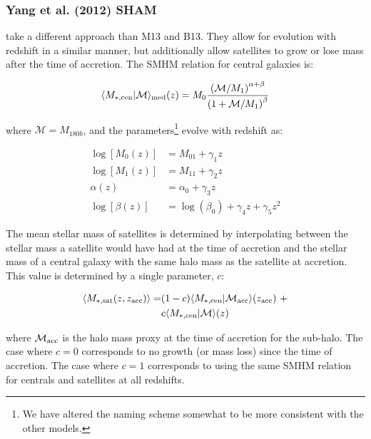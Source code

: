 \documentclass[a4paper,fleqn,usenatbib]{mnras}
\begin{document}
\subsubsection{Yang et al. (2012) SHAM}
\label{sec:y12}

\cite{Yang:2012ew} take a different approach than M13 and B13.  They allow for evolution with redshift in a similar manner, but additionally allow satellites to grow or lose mass after the time of accretion.  The SMHM relation for central galaxies is: 
%
\begin{linenomath}
\begin{equation}
\langle M_{*,\rm cen} |  \mathcal{M} \rangle_{\rm med}(z) = M_{0}\frac{\left( \mathcal{M}/M_1 \right)^{\alpha+\beta}}{\left(1+ \mathcal{M}/M_1 \right)^{\beta}}
\end{equation}  
\end{linenomath}
%
where $\mathcal{M}=M_{180b}$, and the parameters\footnote{We have altered the naming scheme somewhat to be more consistent with the other models.} evolve with redshift as:
%
\begin{linenomath}
\begin{align}
\log[M_{0}(z)] &= M_{01} + \gamma_1 z \\
\log[M_{1}(z)] &= M_{11} + \gamma_2 z \\
\alpha(z) &= \alpha_0 + \gamma_3 z \\
\log[\beta(z)] &= \log(\beta_0) + \gamma_4 z + \gamma_5 z^2
\end{align}
\end{linenomath}
%
The mean stellar mass of satellites is determined by interpolating between the stellar mass a satellite would have had at the time of accretion and the stellar mass of a central galaxy with the same halo mass as the satellite at accretion.  This value is determined by a single parameter, $c$:
%
\begin{linenomath}
\begin{align}
\label{eq:y12sat_model}
\langle M_{*,\rm sat}(z, z_{\rm acc})\rangle =&  (1-c)\langle M_{*,\rm cen} |  \mathcal{M}_{\rm acc} \rangle(z_{\rm acc})~+ \\ \nonumber &  c\langle M_{*,\rm cen}|  \mathcal{M} \rangle(z)
\end{align}
\end{linenomath}
%
where $\mathcal{M}_{\rm acc}$ is the halo mass proxy at the time of accretion for the sub-halo.  The case where $c=0$ corresponds to no growth (or mass loss) since the time of accretion.  The case where $c=1$ corresponds to using the same SMHM relation for centrals and satellites at all redshifts.
\end{document}

